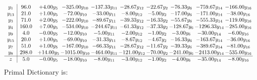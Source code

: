 \documentclass[9pt]{article}
\begin{document}
\[\begin{array}{c| c c@{\hskip 2pt} c@{\hskip 2pt} c@{\hskip 2pt} c@{\hskip 2pt} c@{\hskip 2pt} c@{\hskip 2pt} c@{\hskip 2pt} c@{\hskip 2pt} }
 y_{1}   &  96.0 & +  4.00 y_{5} & -325.00 y_{10} & -137.33 y_{11} & -28.67 y_{12} & -22.67 y_{2} & -76.33 y_{6} & -759.67 y_{14} & -166.00 y_{16}\\
 y_{13}   &  21.0 & +  1.00 y_{5} & -72.00 y_{10} & -33.00 y_{11} & -8.00 y_{12} & -5.00 y_{2} & -17.00 y_{6} & -171.00 y_{14} & -38.00 y_{16}\\
 y_{3}   &  71.0 & +  2.00 y_{5} & -222.00 y_{10} & -89.67 y_{11} & -39.33 y_{12} & -16.33 y_{2} & -55.67 y_{6} & -555.33 y_{14} & -119.00 y_{16}\\
 y_{4}   &  160.0 & +  7.00 y_{5} & -534.00 y_{10} & -244.67 y_{11} & -61.33 y_{12} & -37.33 y_{2} & -128.67 y_{6} & -1296.33 y_{14} & -285.00 y_{16}\\
 y_{9}   &  4.0 & -0.00 y_{5} & -12.00 y_{10} & -5.00 y_{11} & -2.00 y_{12} & -1.00 y_{2} & -3.00 y_{6} & -30.00 y_{14} & -6.00 y_{16}\\
 y_{15}   &  20.0 & +  1.00 y_{5} & -69.00 y_{10} & -31.33 y_{11} & -8.67 y_{12} & -4.67 y_{2} & -16.33 y_{6} & -163.67 y_{14} & -36.00 y_{16}\\
 y_{7}   &  51.0 & +  1.00 y_{5} & -167.00 y_{10} & -66.33 y_{11} & -28.67 y_{12} & -11.67 y_{2} & -39.33 y_{6} & -389.67 y_{14} & -81.00 y_{16}\\
 y_{8}   &  298.0 & + 14.00 y_{5} & -1015.00 y_{10} & -464.00 y_{11} & -121.00 y_{12} & -70.00 y_{2} & -241.00 y_{6} & -2413.00 y_{14} & -535.00 y_{16}\\
\hline
z    &  5.0 & -0.00 y_{5} & -18.00 y_{10} & -8.00 y_{11} & -3.00 y_{12} & -1.00 y_{2} & -4.00 y_{6} & -35.00 y_{14} & -8.00 y_{16}\\
\end{array}\]
Primal Dictionary is:
\end{document}
